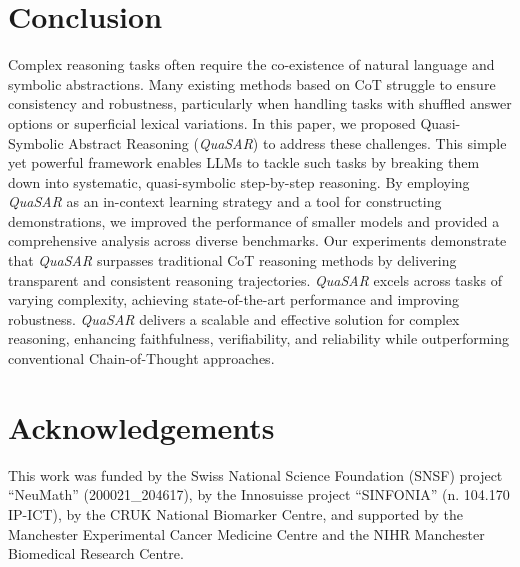 \documentclass[11pt]{article}
\newcommand{\QuaSAR}{\emph{QuaSAR}\xspace}
\begin{document}
\section{Conclusion}

Complex reasoning tasks often require the co-existence of natural language and symbolic abstractions. Many existing methods based on CoT struggle to ensure consistency and robustness, particularly when handling tasks with shuffled answer options or superficial lexical variations.
In this paper, we proposed Quasi-Symbolic Abstract Reasoning (\QuaSAR) to address these challenges. This simple yet powerful framework enables LLMs to tackle such tasks by breaking them down into systematic, quasi-symbolic step-by-step reasoning. By employing \QuaSAR as an in-context learning strategy and a tool for constructing demonstrations, we improved the performance of smaller models and provided a comprehensive analysis across diverse benchmarks.
Our experiments demonstrate that \QuaSAR surpasses traditional CoT reasoning methods by delivering transparent and consistent reasoning trajectories. \QuaSAR excels across tasks of varying complexity, achieving state-of-the-art performance and improving robustness. \QuaSAR delivers a scalable and effective solution for complex reasoning, enhancing faithfulness, verifiability, and reliability while outperforming conventional Chain-of-Thought approaches.

\section*{Acknowledgements}
This work was funded by the Swiss National Science Foundation (SNSF) project ``NeuMath'' (200021\_204617), by the Innosuisse project ``SINFONIA'' (n. 104.170 IP-ICT), by the CRUK National Biomarker Centre, and supported by the Manchester Experimental Cancer Medicine Centre and the NIHR Manchester Biomedical Research Centre.




\appendix
\end{document}

